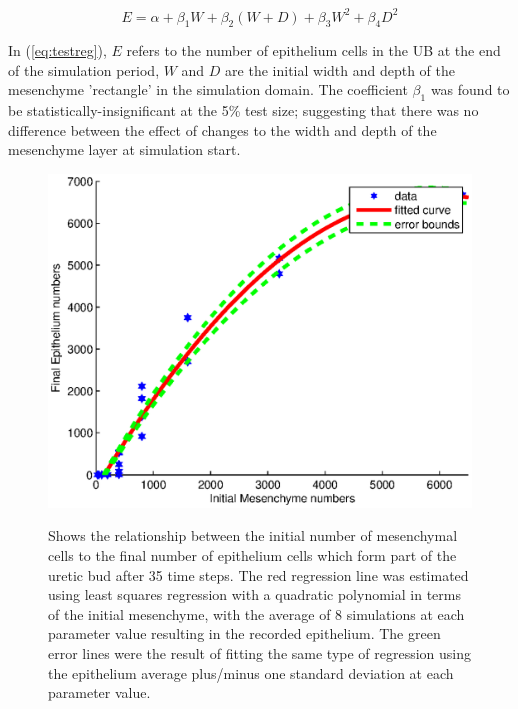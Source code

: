 \documentclass[pdftex,10pt,a4paper,twocolumn]{article}
\begin{document}
\begin{equation}\label{eq:testreg}
E = \alpha + \beta_1 W + \beta_2 (W + D) + \beta_3 W^2 + \beta_4 D^2
\end{equation}

In (\ref{eq:testreg}), $E$ refers to the number of epithelium cells in the UB at the end of the simulation period, $W$ and $D$ are the initial width and depth of the mesenchyme 'rectangle' in the simulation domain. The coefficient $\beta_1$ was found to be statistically-insignificant at the 5\% test size; suggesting that there was no difference between the effect of changes to the width and depth of the mesenchyme layer at simulation start.



\begin{figure}[t] 
\centering
\scalebox{1.0} 
{\includegraphics{cell_numbers.eps}}
\caption{Shows the relationship between the initial number of mesenchymal cells to the final number of epithelium cells which form part of the uretic bud after 35 time steps. The red regression line was estimated using least squares regression with a quadratic polynomial in terms of the initial mesenchyme, with the average of 8 simulations at each parameter value resulting in the recorded epithelium. The green error lines were the result of fitting the same type of regression using the epithelium average plus/minus one standard deviation at each parameter value.}\label{fig:nums}
\end{figure} 
\end{document}
